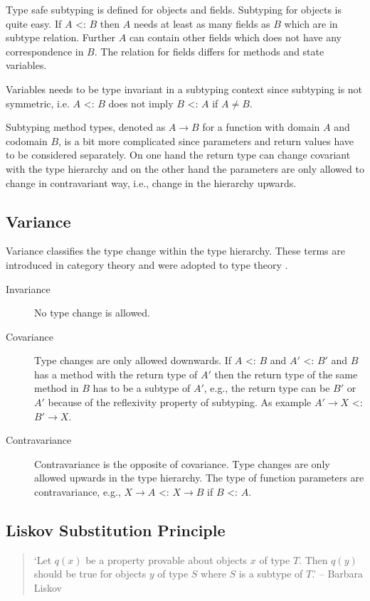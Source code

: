 Type safe subtyping is defined for objects and fields. Subtyping for objects is
quite easy. If $A$ <: $B$ then $A$ needs at least as many fields as $B$
which are in subtype relation. Further $A$ can contain other fields
which does not have any correspondence in $B$. The relation for fields
differs for methods and state variables.

Variables needs to be type invariant in a subtyping context since
subtyping is not symmetric, i.e. $A$ <: $B$ does not imply $B$ <: $A$
if $A \neq B$.

Subtyping method types, denoted as $A \rightarrow B$ for a function with
domain $A$ and codomain $B$, is a bit more complicated since parameters
and return values have to be considered separately. On one hand the return
type can change covariant with the type hierarchy and on the other hand
the parameters are only allowed to change in contravariant way, i.e.,
change in the hierarchy upwards.

\subsection{Variance}
Variance classifies the type change within the type hierarchy. These
terms are introduced in category theory and were adopted to type theory
\cite{pierce_basic_1991}.

\begin{description}
	\item[Invariance] No type change is allowed.
	\item[Covariance] Type changes are only allowed downwards. If $A$
	<: $B$ and $A'$ <: $B'$ and $B$ has a method with the return
	type of $A'$ then the return type of the same method in $B$
	has to be a subtype of $A'$, e.g., the return type can be $B'$
	or $A'$ because of the reflexivity property of subtyping. As
	example $A' \rightarrow X$ <: $B' \rightarrow X$.
	\item[Contravariance] Contravariance is the opposite of
	covariance. Type changes are only allowed upwards in the type
	hierarchy. The type of function parameters are contravariance,
	e.g., $X \rightarrow A$ <: $X \rightarrow B$ if $B$ <: $A$.
\end{description}

\subsection{Liskov Substitution Principle}
\begin{quotation}
`Let $q(x)$ be a property provable about objects $x$ of type $T$. Then
$q(y)$ should be true for objects $y$ of type $S$ where $S$ is a subtype
of $T$.' -- Barbara Liskov \cite{liskov_behavioral_1999}
\end{quotation}

